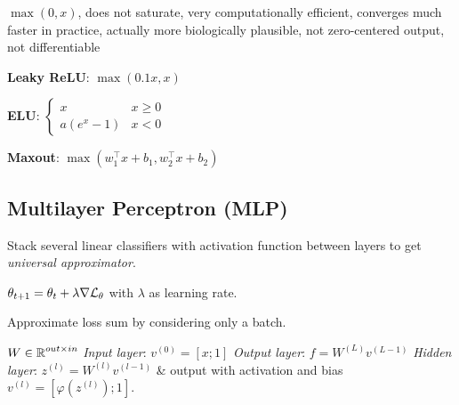 \begin{definition}[ReLU]
  \(\max(0, x)\), does not saturate, very computationally efficient, converges much faster in practice, actually more biologically plausible, not zero-centered output, not differentiable
\end{definition}

\begin{itemize*}
  \item \textbf{Leaky ReLU}: \(\max(0.1x, x)\)
  \item \textbf{ELU}: \(\begin{cases}
    x & x \geq 0 \\
    a(e^x - 1) & x < 0
  \end{cases}\) \\
  \item \textbf{Maxout}: \(\max(w_1^\top x + b_1, w_2^\top x + b_2)\)
\end{itemize*}

\subsection{Multilayer Perceptron (MLP)}
Stack several linear classifiers with activation function between layers to get \textit{universal approximator}.

\begin{definition}
  \(\theta_{t+1} = \theta_t + \lambda \nabla \mathcal{L}_\theta\) with \(\lambda\) as learning rate.
\end{definition}

\begin{definition}[SGD]
  Approximate loss sum by considering only a batch.
\end{definition}

\begin{definition}[Forwardpropagation]
  \(W \in \operatorname{\mathbb{R}}^{out \times in}\)
  \textit{Input layer}: \(v^{(0)} = [x; 1]\)
  \textit{Output layer}: \(f = W^{(L)}v^{(L-1)}\)
  \textit{Hidden layer}: \(z^{(l)} = W^{(l)}v^{(l-1)}\) \& output with activation and bias \(v^{(l)} = [\varphi(z^{(l)}); 1]\).
\end{definition}

